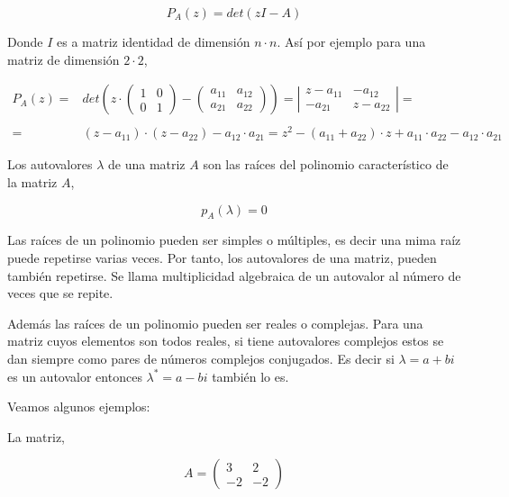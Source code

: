 \begin{equation*}
P_A(z)=det(zI-A)
\end{equation*}
\begin{paracol}{2}
Donde $I$ es a matriz identidad de dimensión $n \cdot n$. Así por ejemplo para una matriz de dimensión $2\cdot 2$,
\end{paracol}
\begin{align*}
P_A(z)=&det\left(z\cdot \begin{pmatrix}
1& 0\\
0& 1
\end{pmatrix}- \begin{pmatrix}
a_{11}& a_{12}\\
a_{21}& a_{22}
\end{pmatrix} \right)=\left\vert \begin{matrix}
z-a_{11}& -a_{12}\\
-a_{21}& z-a_{22}
\end{matrix} \right\vert=\\
\\
=&(z-a_{11})\cdot(z-a_{22})-a_{12}\cdot a_{21}=z^2-(a_{11}+a_{22})\cdot z+a_{11}\cdot a_{22}-a_{12}\cdot a_{21}
\end{align*}
\begin{paracol}{2}
Los autovalores $\lambda$ de una matriz $A$ son las raíces del polinomio característico de la matriz $A$,
\end{paracol}
\begin{equation*}
p_A(\lambda)=0
\end{equation*}
\begin{paracol}{2}
Las raíces de un polinomio pueden ser simples o múltiples, es decir una mima raíz puede repetirse varias veces. Por tanto, los autovalores de una matriz, pueden también repetirse. Se llama multiplicidad algebraica de un autovalor al número de veces que se repite.

Además las raíces de un polinomio pueden ser reales o complejas. Para una matriz cuyos elementos son todos reales, si tiene autovalores complejos estos se dan siempre como pares de números complejos conjugados. Es decir si $\lambda =a+bi$ es un autovalor entonces $\lambda^*=a-bi$ también lo es.

Veamos algunos ejemplos:

La matriz,
\end{paracol}
\begin{equation*}
A=\begin{pmatrix}
3& 2\\
-2& -2
\end{pmatrix}
\end{equation*}
